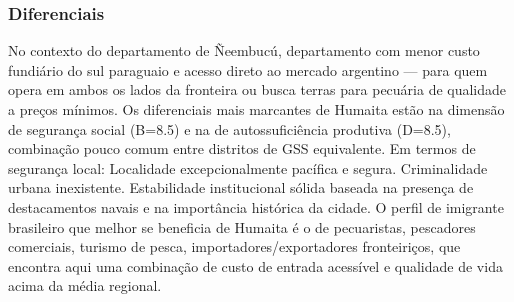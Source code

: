 \subsubsection*{Diferenciais}\label{dif-humaita-1207}
No contexto do departamento de Ñeembucú, departamento com menor custo fundiário do sul paraguaio e acesso direto ao mercado argentino — para quem opera em ambos os lados da fronteira ou busca terras para pecuária de qualidade a preços mínimos. Os diferenciais mais marcantes de Humaita estão na dimensão de segurança social (B=8.5) e na de autossuficiência produtiva (D=8.5), combinação pouco comum entre distritos de GSS equivalente. Em termos de segurança local: Localidade excepcionalmente pacífica e segura. Criminalidade urbana inexistente. Estabilidade institucional sólida baseada na presença de destacamentos navais e na importância histórica da cidade. O perfil de imigrante brasileiro que melhor se beneficia de Humaita é o de pecuaristas, pescadores comerciais, turismo de pesca, importadores/exportadores fronteiriços, que encontra aqui uma combinação de custo de entrada acessível e qualidade de vida acima da média regional.
